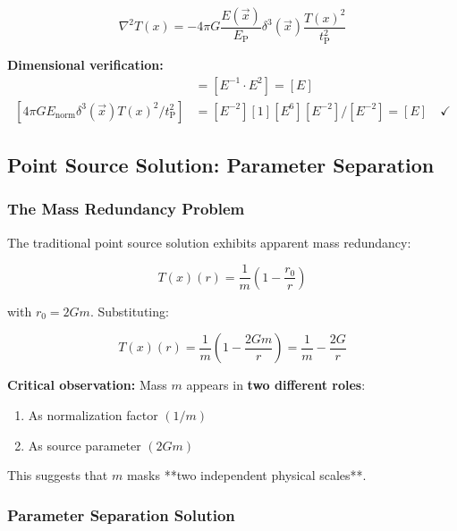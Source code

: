\documentclass[12pt,a4paper]{article}
\newcommand{\Tfield}{T(x)}
\newcommand{\vecx}{\vec{x}}
\newcommand{\tP}{t_{\text{P}}}
\newcommand{\EP}{E_{\text{P}}}
\begin{document}
	\begin{equation}
		\boxed{\nabla^2 \Tfield = -4\pi G \frac{E(\vecx)}{\EP} \delta^3(\vecx) \frac{\Tfield^2}{\tP^2}}
		\label{eq:field_equation_mass_free}
	\end{equation}
	
	\textbf{Dimensional verification:}
	\begin{align}
		[\nabla^2 \Tfield] &= [E^{-1} \cdot E^2] = [E] \\
		[4\pi G E_{\text{norm}} \delta^3(\vecx) \Tfield^2/\tP^2] &= [E^{-2}][1][E^6][E^{-2}]/[E^{-2}] = [E] \quad \checkmark
	\end{align}
	
	\subsection{Point Source Solution: Parameter Separation}
	\label{subsec:point_source_elimination}
	
	\subsubsection{The Mass Redundancy Problem}
	
	The traditional point source solution exhibits apparent mass redundancy:
	
	\begin{equation}
		\Tfield(r) = \frac{1}{m}\left(1 - \frac{r_0}{r}\right)
		\label{eq:point_source_original}
	\end{equation}
	
	with $r_0 = 2Gm$. Substituting:
	
	\begin{equation}
		\Tfield(r) = \frac{1}{m}\left(1 - \frac{2Gm}{r}\right) = \frac{1}{m} - \frac{2G}{r}
		\label{eq:mass_redundancy}
	\end{equation}
	
	\textbf{Critical observation:} Mass $m$ appears in \textbf{two different roles}:
	\begin{enumerate}
		\item As normalization factor $(1/m)$
		\item As source parameter $(2Gm)$
	\end{enumerate}
	
	This suggests that $m$ masks **two independent physical scales**.
	
	\subsubsection{Parameter Separation Solution}
	
\end{document}
